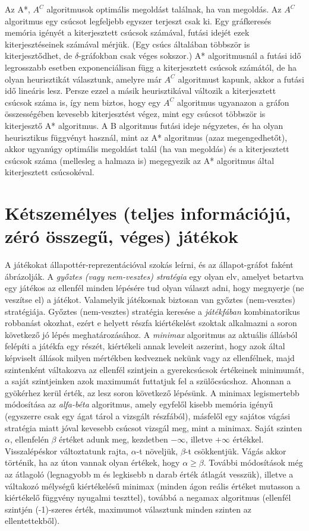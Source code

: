 \documentclass[margin=0px]{article}
\begin{document}
	Az A*, $A^C$ algoritmusok optimális megoldást találnak, ha van megoldás. Az $A^C$ algoritmus egy csúcsot legfeljebb egyszer terjeszt csak ki.
	Egy gráfkeresés memória igényét a kiterjesztett csúcsok számával, futási idejét ezek kiterjesztéseinek számával mérjük. (Egy csúcs általában többször is kiterjesztődhet, de $\delta$-gráfokban csak véges sokszor.) A* algoritmusnál a futási idő legrosszabb esetben exponenciálisan függ a kiterjesztett csúcsok számától, de ha olyan heurisztikát választunk, amelyre már $A^C$ algoritmust kapunk, akkor a futási idő lineáris lesz. Persze ezzel a másik heurisztikával változik a kiterjesztett csúcsok száma is, így nem biztos, hogy egy $A^C$ algoritmus ugyanazon a gráfon összességében kevesebb kiterjesztést végez, mint egy csúcsot többször is kiterjesztő A* algoritmus. A B algoritmus futási ideje négyzetes, és ha olyan heurisztikus függvényt használ, mint az A* algoritmus (azaz megengedhetőt), akkor ugyanúgy optimális megoldást talál (ha van megoldás) és a kiterjesztett csúcsok száma (mellesleg a halmaza is) megegyezik az A* algoritmus által kiterjesztett csúcsokéval.
	
	\section{Kétszemélyes (teljes információjú, zéró összegű, véges) játékok}

	A játékokat állapottér-reprezentációval szokás leírni, és az állapot-gráfot faként ábrázolják.
	A \textit{győztes (vagy nem-vesztes) stratégia} egy olyan elv, amelyet betartva egy játékos az ellenfél minden lépésére tud olyan választ adni, hogy megnyerje (ne veszítse el) a játékot. Valamelyik játékosnak biztosan van győztes (nem-vesztes) stratégiája. Győztes (nem-vesztes) stratégia keresése a \textit{játékfában} kombinatorikus robbanást okozhat, ezért e helyett részfa kiértékelést szoktak alkalmazni a soron következő jó lépés meghatározásához.
	A \textit{minimax} algoritmus az aktuális állásból felépíti a játékfa egy részét, kiértékeli annak leveleit aszerint, hogy azok által képviselt állások milyen mértékben kedveznek nekünk vagy az ellenfélnek, majd szintenként váltakozva az ellenfél szintjein a gyerekcsúcsok értékeinek minimumát, a saját szintjeinken azok maximumát futtatjuk fel a szülőcsúcshoz. Ahonnan a gyökérhez kerül érték, az lesz soron következő lépésünk.
	A minimax legismertebb módosítása az \textit{alfa-béta} algoritmus, amely egyfelől kisebb memória igényű (egyszerre csak egy ágat tárol a vizsgált részfából), másfelől egy sajátos vágási stratégia miatt jóval kevesebb csúcsot vizsgál meg, mint a minimax. Saját szinten $\alpha$, ellenfelén $\beta$ értéket adunk meg, kezdetben $-\infty$, illetve $+\infty$ értékkel. Visszalépéskor változtatunk rajta, $\alpha$-t növeljük, $\beta$-t csökkentjük. Vágás akkor történik, ha az úton vannak olyan értékek, hogy $\alpha \geq \beta$.
	További módosítások még az átlagoló (legnagyobb m és legkisebb n darab érték átlagát vesszük), illetve a váltakozó mélységű kiértékelésű minimax (minden ágon reális értéket mutasson a kiértékelő függvény nyugalmi teszttel), továbbá a negamax algoritmus (ellenfél szintjén (-1)-szeres érték, maximumot választunk minden szinten az ellentettekből).
	
\end{document}
